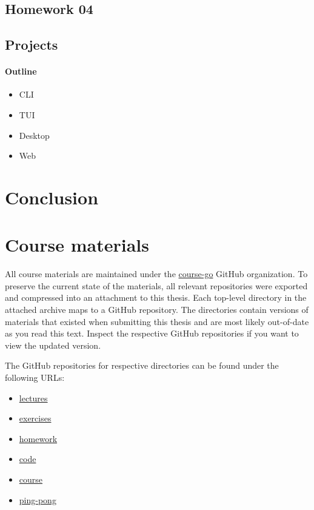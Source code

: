 \documentclass[
  digital,
  color,
  oneside,
  nosansbold,
  nocolorbold,
  lof,
  lot,
]{fithesis4}
\begin{document}
\section{Homework 04}

\section{Projects}

\subsubsection{Outline}

\begin{itemize}
    \item CLI
    \item TUI
    \item Desktop
    \item Web
\end{itemize}

\chapter{Conclusion}

\printbibliography[heading=bibintoc]

\appendix
\chapter{Course materials}

All course materials are maintained under the \href{https://github.com/course-go}{course-go} GitHub organization. To preserve the current state of the materials, all relevant repositories were exported and compressed into an attachment to this thesis. Each top-level directory in the attached archive maps to a GitHub repository. The directories contain versions of materials that existed when submitting this thesis and are most likely out-of-date as you read this text. Inspect the respective GitHub repositories if you want to view the updated version.

The GitHub repositories for respective directories can be found under the following URLs:
\begin{itemize}
    \item \href{https://github.com/course-go/lectures}{lectures}
    \item \href{https://github.com/course-go/exercises}{exercises}
    \item \href{https://github.com/course-go/homework}{homework}
    \item \href{https://github.com/course-go/code}{code}
    \item \href{https://github.com/course-go/course}{course}
    \item \href{https://github.com/course-go/ping-pong}{ping-pong}
\end{itemize}
\end{document}
